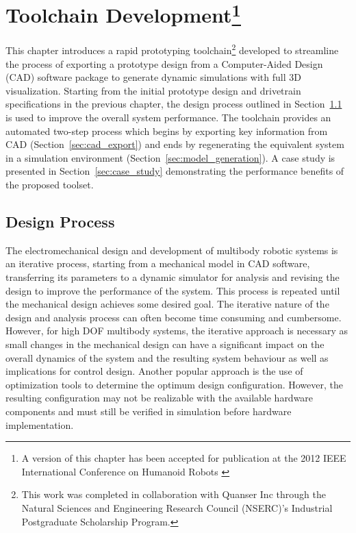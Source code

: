 \chapter[Toolchain Development]{Toolchain Development\footnote{A version of this chapter has been accepted for publication at the 2012 IEEE International Conference on Humanoid Robots \cite{ChoudhuryHumanoids2012}}} %
\label{cha:toolchain}

This chapter introduces a rapid prototyping toolchain\footnote{This work was completed in collaboration with Quanser Inc through the Natural Sciences and Engineering Research Council (NSERC)'s Industrial Postgraduate Scholarship Program.} developed to streamline the process of exporting a prototype design from a Computer-Aided Design (CAD) software package to generate dynamic simulations with full 3D visualization. Starting from the initial prototype design and drivetrain specifications in the previous chapter, the design process outlined in Section~\ref{sec:design_process} is used to improve the overall system performance. The toolchain provides an automated two-step process which begins by exporting key information from CAD (Section~\ref{sec:cad_export}) and ends by regenerating the equivalent system in a simulation environment (Section~\ref{sec:model_generation}). A case study is presented in Section~\ref{sec:case_study} demonstrating the performance benefits of the proposed toolset. 

\section{Design Process} %
\label{sec:design_process}

The electromechanical design and development of multibody robotic systems is an iterative process, starting from a mechanical model in CAD software, transferring its parameters to a dynamic simulator for analysis and revising the design to improve the performance of the system. This process is repeated until the mechanical design achieves some desired goal. The iterative nature of the design and analysis process can often become time consuming and cumbersome. However, for high DOF multibody systems, the iterative approach is necessary as small changes in the mechanical design can have a significant impact on the overall dynamics of the system and the resulting system behaviour as well as implications for control design. Another popular approach is the use of optimization tools \cite{Paul2001,Wollherr2002} to determine the optimum design configuration. However, the resulting configuration may not be realizable with the available hardware components and must still be verified in simulation before hardware implementation. 

